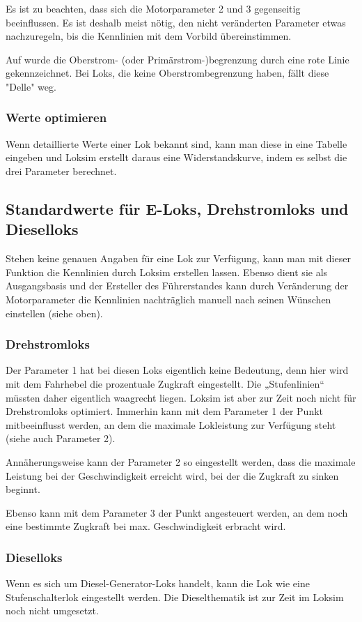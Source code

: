 Es ist zu beachten, dass sich die Motorparameter 2 und 3 gegenseitig beeinflussen. Es ist deshalb meist nötig, den nicht veränderten Parameter etwas nachzuregeln, bis die Kennlinien mit dem Vorbild übereinstimmen.

Auf  wurde die Oberstrom- (oder Primärstrom-)begrenzung durch eine rote Linie gekennzeichnet. Bei Loks, die keine Oberstrombegrenzung haben, fällt diese "Delle" weg.


\subsubsection{Werte optimieren}
Wenn detaillierte Werte einer Lok bekannt sind, kann man diese in eine Tabelle eingeben und Loksim erstellt daraus eine Widerstandskurve, indem es selbst die drei Parameter berechnet.

\subsection{Standardwerte für E-Loks, Drehstromloks und Dieselloks}
Stehen keine genauen Angaben für eine Lok zur Verfügung, kann man mit dieser Funktion die Kennlinien durch Loksim erstellen lassen. Ebenso dient sie als Ausgangsbasis und der Ersteller des Führerstandes kann durch Veränderung der Motorparameter die Kennlinien nachträglich manuell nach seinen Wünschen einstellen (siehe oben).

\subsubsection{Drehstromloks}
Der Parameter 1 hat bei diesen Loks eigentlich keine Bedeutung, denn hier wird mit dem Fahrhebel die prozentuale Zugkraft eingestellt. Die „Stufenlinien“ müssten daher eigentlich waagrecht liegen. Loksim ist aber zur Zeit noch nicht für Drehstromloks optimiert.
Immerhin kann mit dem Parameter 1 der Punkt mitbeeinflusst werden, an dem die maximale Lokleistung zur Verfügung steht (siehe auch Parameter 2).

Annäherungsweise kann der Parameter 2 so eingestellt werden, dass die maximale Leistung bei der Geschwindigkeit erreicht wird, bei der die Zugkraft zu sinken beginnt.

Ebenso kann mit dem Parameter 3 der Punkt angesteuert werden, an dem noch eine bestimmte Zugkraft bei max. Geschwindigkeit erbracht wird.

\subsubsection{Dieselloks}
Wenn es sich um Diesel-Generator-Loks handelt, kann die Lok wie eine Stufenschalterlok eingestellt werden. Die Dieselthematik ist zur Zeit im Loksim noch nicht umgesetzt.


